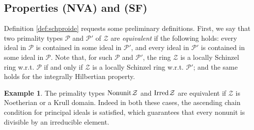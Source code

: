 \documentclass[11pt,a4paper,reqno]{amsart}
\theoremstyle{definition}
\newtheorem{exa}[thm]{Example}
\begin{document}
\subsection{Properties (NVA) and (SF)}\label{ss:stronSchpro}
Definition \ref{def:schproide} 
requests some preliminary definitions. First, we say that two primality types $\mathcal{P}$ and $\mathcal{P}'$ of $\mathcal{Z}$ are \emph{equivalent} if the following holds: {every ideal in $\mathcal{P}$ is contained in some ideal in $\mathcal{P}'$, and every ideal in $\mathcal{P}'$ is contained in some ideal in $\mathcal{P}$}. Note that, for such $\mathcal{P}$ and $\mathcal{P}'$, the ring $\mathcal{Z}$ is a locally Schinzel ring \hbox{w.r.t.} $\mathcal{P}$ if and only if $\mathcal{Z}$ is a locally Schinzel ring \hbox{w.r.t.} $\mathcal{P}'$; and the same holds for the integrally Hilbertian property.  

\begin{exa}
The primality types ${\rm Nonunit} \hskip 1pt \mathcal{Z}$ and ${\rm Irred} \hskip 1pt \mathcal{Z}$ are equivalent if $\mathcal{Z}$ is Noetherian or a Krull domain. Indeed in both these cases, the ascending chain condition for principal ideals is satisfied, which guarantees that every nonunit is divisible by an irreducible element.
\end{exa}
\end{document}
